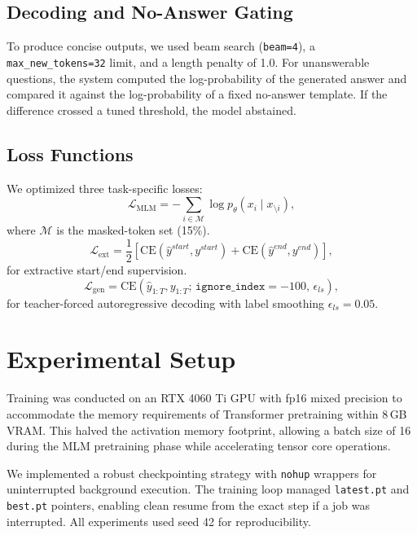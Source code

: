 \documentclass[10pt,twocolumn]{article}
\begin{document}
\subsection{Decoding and No-Answer Gating}
To produce concise outputs, we used beam search (\texttt{beam=4}), a \texttt{max\_new\_tokens=32} limit, and a length penalty of 1.0. For unanswerable questions, the system computed the log-probability of the generated answer and compared it against the log-probability of a fixed no-answer template. If the difference crossed a tuned threshold, the model abstained.
\subsection{Loss Functions}
We optimized three task-specific losses:
\begin{equation}
\mathcal{L}_{\text{MLM}} = - \sum_{i \in \mathcal{M}} \log p_{\theta}(x_i \mid x_{\setminus i}),
\end{equation}
where $\mathcal{M}$ is the masked-token set (15\%).
\begin{equation}
\mathcal{L}_{\text{ext}} = \frac{1}{2}\left[\mathrm{CE}(\hat{y}^{start}, y^{start}) + \mathrm{CE}(\hat{y}^{end}, y^{end})\right],
\end{equation}
for extractive start/end supervision.
\begin{equation}
\mathcal{L}_{\text{gen}} = \mathrm{CE}(\hat{y}_{1:T}, y_{1:T};\, \texttt{ignore\_index}=-100,\, \epsilon_{ls}),
\end{equation}
for teacher-forced autoregressive decoding with label smoothing $\epsilon_{ls} = 0.05$.
\section{Experimental Setup}

Training was conducted on an RTX 4060 Ti GPU with fp16 mixed precision to accommodate the memory requirements of Transformer pretraining within 8\,GB VRAM. This halved the activation memory footprint, allowing a batch size of 16 during the MLM pretraining phase while accelerating tensor core operations.

We implemented a robust checkpointing strategy with \texttt{nohup} wrappers for uninterrupted background execution. The training loop managed \texttt{latest.pt} and \texttt{best.pt} pointers, enabling clean resume from the exact step if a job was interrupted. All experiments used seed 42 for reproducibility.
\end{document}
